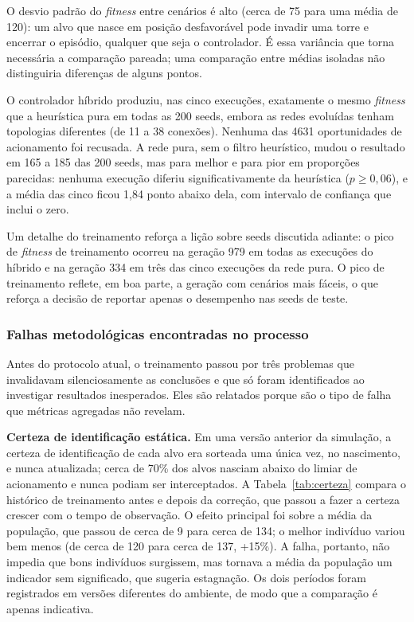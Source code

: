 \documentclass[12pt,a4paper]{article}
\begin{document}
O desvio padrão do \textit{fitness} entre cenários é alto (cerca de 75 para uma média de 120): um
alvo que nasce em posição desfavorável pode invadir uma torre e encerrar o episódio, qualquer que
seja o controlador. É essa variância que torna necessária a comparação pareada; uma comparação
entre médias isoladas não distinguiria diferenças de alguns pontos.

O controlador híbrido produziu, nas cinco execuções, exatamente o mesmo \textit{fitness} que a
heurística pura em todas as 200 seeds, embora as redes evoluídas tenham topologias diferentes
(de 11 a 38 conexões). Nenhuma das 4631 oportunidades de acionamento foi recusada. A rede pura, sem
o filtro heurístico, mudou o resultado em 165 a 185 das 200 seeds, mas para melhor e para pior em
proporções parecidas: nenhuma execução diferiu significativamente da heurística ($p \geq 0{,}06$),
e a média das cinco ficou 1,84 ponto abaixo dela, com intervalo de confiança que inclui o zero.

Um detalhe do treinamento reforça a lição sobre seeds discutida adiante: o pico de \textit{fitness}
de treinamento ocorreu na geração 979 em todas as execuções do híbrido e na geração 334 em três das
cinco execuções da rede pura. O pico de treinamento reflete, em boa parte, a geração com cenários
mais fáceis, o que reforça a decisão de reportar apenas o desempenho nas seeds de teste.

\subsubsection{Falhas metodológicas encontradas no processo}

Antes do protocolo atual, o treinamento passou por três problemas que invalidavam silenciosamente
as conclusões e que só foram identificados ao investigar resultados inesperados. Eles são relatados
porque são o tipo de falha que métricas agregadas não revelam.

\textbf{Certeza de identificação estática.} Em uma versão anterior da simulação, a certeza de
identificação de cada alvo era sorteada uma única vez, no nascimento, e nunca atualizada; cerca de
70\% dos alvos nasciam abaixo do limiar de acionamento e nunca podiam ser interceptados. A
Tabela~\ref{tab:certeza} compara o histórico de treinamento antes e depois da correção, que passou a
fazer a certeza crescer com o tempo de observação. O efeito principal foi sobre a média da população,
que passou de cerca de 9 para cerca de 134; o melhor indivíduo variou bem menos (de cerca de 120
para cerca de 137, +15\%). A falha, portanto, não impedia que bons indivíduos surgissem, mas tornava
a média da população um indicador sem significado, que sugeria estagnação. Os dois períodos foram
registrados em versões diferentes do ambiente, de modo que a comparação é apenas indicativa.
\end{document}
